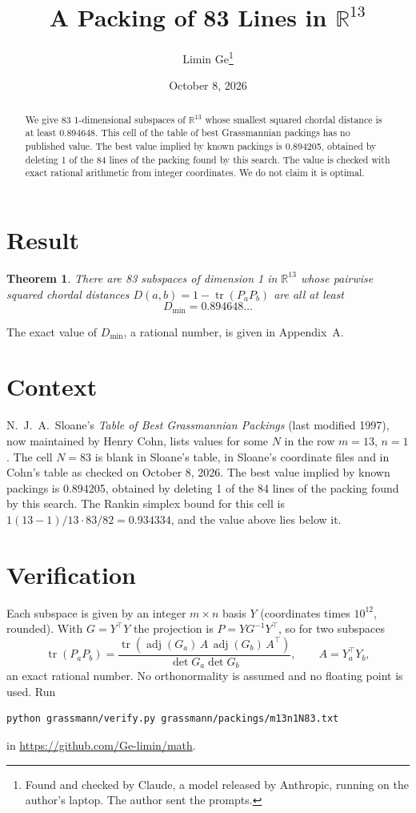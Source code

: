 \documentclass[11pt,a4paper]{article}
\title{A Packing of 83 Lines in $\mathbb{R}^{13}$}
\author{Limin Ge\thanks{Found and checked by Claude, a model released by Anthropic, running on the author's laptop. The author sent the prompts.}}
\date{October 8, 2026}
\newtheorem*{theorem}{Theorem}
\begin{document}
\maketitle
\begin{abstract}
We give 83 1-dimensional subspaces of $\mathbb{R}^{13}$ whose smallest squared chordal distance is at least 0.894648. This cell of the table of best Grassmannian packings has no published value. The best value implied by known packings is 0.894205, obtained by deleting 1 of the 84 lines of the packing found by this search. The value is checked with exact rational arithmetic from integer coordinates. We do not claim it is optimal.
\end{abstract}

\section{Result}
\begin{theorem}
There are 83 subspaces of dimension 1 in $\mathbb{R}^{13}$ whose pairwise squared chordal distances $D(a,b) = 1 - \operatorname{tr}(P_aP_b)$ are all at least
\[ D_{\min} = 0.894648\ldots \]
\end{theorem}
The exact value of $D_{\min}$, a rational number, is given in Appendix~A.


\section{Context}
N.~J.~A.~Sloane's \emph{Table of Best Grassmannian Packings} (last modified 1997), now maintained by Henry Cohn, lists values for some $N$ in the row $m=13$, $n=1$. The cell $N=83$ is blank in Sloane's table, in Sloane's coordinate files and in Cohn's table as checked on October 8, 2026. The best value implied by known packings is 0.894205, obtained by deleting 1 of the 84 lines of the packing found by this search. The Rankin simplex bound for this cell is $1(13-1)/13\cdot 83/82 = 0.934334$, and the value above lies below it.


\section{Verification}
Each subspace is given by an integer $m\times n$ basis $Y$ (coordinates times $10^{12}$, rounded). With $G=Y^\top Y$ the projection is $P=YG^{-1}Y^\top$, so for two subspaces
\[ \operatorname{tr}(P_aP_b)=\frac{\operatorname{tr}(\operatorname{adj}(G_a)\,A\,\operatorname{adj}(G_b)\,A^\top)}{\det G_a\det G_b},\qquad A=Y_a^\top Y_b, \]
an exact rational number. No orthonormality is assumed and no floating point is used. Run
\begin{verbatim}
python grassmann/verify.py grassmann/packings/m13n1N83.txt
\end{verbatim}
in \url{https://github.com/Ge-limin/math}.
\end{document}
